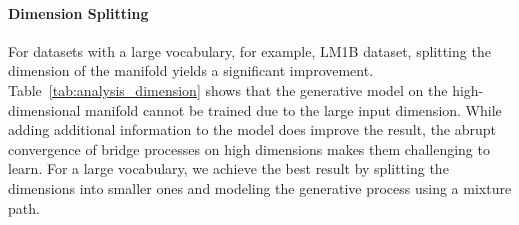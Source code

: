 \paragraph{Dimension Splitting}
For datasets with a large vocabulary, for example, LM1B dataset, splitting the dimension of the manifold yields a significant improvement.
Table~\ref{tab:analysis_dimension} shows that the generative model on the high-dimensional manifold cannot be trained due to the large input dimension. While adding additional information to the model does improve the result, the abrupt convergence of bridge processes on high dimensions makes them challenging to learn. For a large vocabulary, we achieve the best result by splitting the dimensions into smaller ones and modeling the generative process using a mixture path.


